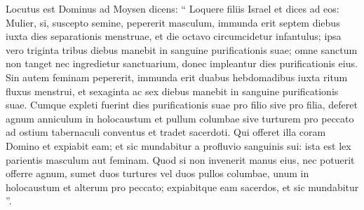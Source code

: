 \begin{biblechapter}
\begin{biblechapter}
\begin{biblechapter}
\begin{biblechapter}
\begin{biblechapter}
\begin{biblechapter}
\begin{biblechapter}
\begin{biblechapter}
\begin{biblechapter}
\begin{biblechapter}
\begin{biblechapter}
\begin{biblechapter}
\verse Locutus est Dominus ad Moysen dicens: 
\verse “ Loquere filiis Israel et dices ad eos: Mulier, si, suscepto semine, pepererit masculum, immunda erit septem diebus iuxta dies separationis menstruae, 
\verse et die octavo circumcidetur infantulus; 
\verse ipsa vero triginta tribus diebus manebit in sanguine purificationis suae; omne sanctum non tanget nec ingredietur sanctuarium, donec impleantur dies purificationis eius.
 \verse Sin autem feminam pepererit, immunda erit duabus hebdomadibus iuxta ritum fluxus menstrui, et sexaginta ac sex diebus manebit in sanguine purificationis suae.
 \verse Cumque expleti fuerint dies purificationis suae pro filio sive pro filia, deferet agnum anniculum in holocaustum et pullum columbae sive turturem pro peccato ad ostium tabernaculi conventus et tradet sacerdoti. 
\verse Qui offeret illa coram Domino et expiabit eam; et sic mundabitur a profluvio sanguinis sui: ista est lex parientis masculum aut feminam.
 \verse Quod si non invenerit manus eius, nec potuerit offerre agnum, sumet duos turtures vel duos pullos columbae, unum in holocaustum et alterum pro peccato; expiabitque eam sacerdos, et sic mundabitur ”.
 

\end{biblechapter}
\end{biblechapter}
\end{biblechapter}
\end{biblechapter}
\end{biblechapter}
\end{biblechapter}
\end{biblechapter}
\end{biblechapter}
\end{biblechapter}
\end{biblechapter}
\end{biblechapter}
\end{biblechapter}
